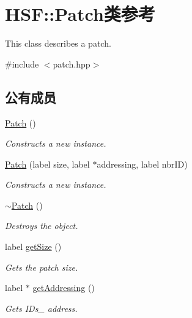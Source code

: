 \hypertarget{classHSF_1_1Patch}{
\section{HSF::Patch类参考}
\label{classHSF_1_1Patch}
}


This class describes a patch.  


{\ttfamily \#include $<$patch.hpp$>$}\subsection*{公有成员}
\begin{DoxyCompactItemize}
\item 
\hyperlink{classHSF_1_1Patch_a8bbb4ee433e8b808809e1de6ccc4b06a}{Patch} ()
\begin{DoxyCompactList}\small\item\em Constructs a new instance. \item\end{DoxyCompactList}\item 
\hyperlink{classHSF_1_1Patch_a9a1d8945a0e699397820dc7c83dd706f}{Patch} (label size, label $\ast$addressing, label nbrID)
\begin{DoxyCompactList}\small\item\em Constructs a new instance. \item\end{DoxyCompactList}\item 
\hyperlink{classHSF_1_1Patch_ac4002381f5600d00ce48e8d2a1d979c4}{$\sim$Patch} ()
\begin{DoxyCompactList}\small\item\em Destroys the object. \item\end{DoxyCompactList}\item 
label \hyperlink{classHSF_1_1Patch_a2710e0b6ccba9c2a5462d77a83a077ba}{getSize} ()
\begin{DoxyCompactList}\small\item\em Gets the patch size. \item\end{DoxyCompactList}\item 
label $\ast$ \hyperlink{classHSF_1_1Patch_a77780024fa9be8ca1de644d4ac8c3478}{getAddressing} ()
\begin{DoxyCompactList}\small\item\em Gets IDs\_\- address. \item\end{DoxyCompactList}\item 

\end{DoxyCompactItemize}
